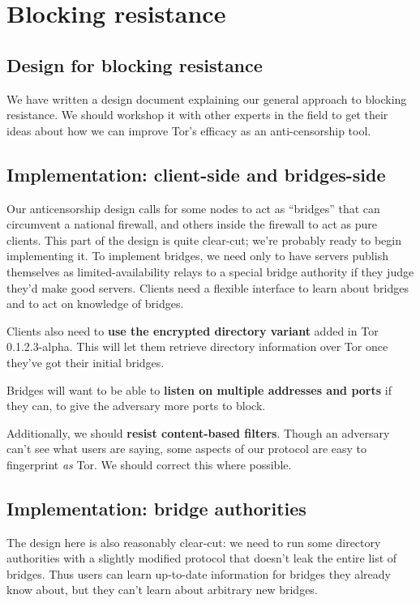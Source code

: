 \documentclass{article}
\begin{document}
\section{Blocking resistance}

\subsection{Design for blocking resistance}
We have written a design document explaining our general approach to blocking
resistance.  We should workshop it with other experts in the field to get
their ideas about how we can improve Tor's efficacy as an anti-censorship
tool.


\subsection{Implementation: client-side and bridges-side}
Our anticensorship design calls for some nodes to act as ``bridges'' that can
circumvent a national firewall, and others inside the firewall to act as pure
clients.  This part of the design is quite clear-cut; we're probably ready to begin
implementing it.  To implement bridges, we need only to have servers publish
themselves as limited-availability relays to a special bridge authority if
they judge they'd make good servers.  Clients need a flexible interface to
learn about bridges and to act on knowledge of bridges.

Clients also need to {\bf use the encrypted directory variant} added in Tor
0.1.2.3-alpha.  This will let them retrieve directory information over Tor
once they've got their initial bridges.

Bridges will want to be able to {\bf listen on multiple addresses and ports}
if they can, to give the adversary more ports to block.

Additionally, we should {\bf resist content-based filters}.  Though an
adversary can't see what users are saying, some aspects of our protocol are
easy to fingerprint {\em as} Tor.  We should correct this where possible.

\subsection{Implementation: bridge authorities}

The design here is also reasonably clear-cut: we need to run some
directory authorities with a slightly modified protocol that doesn't leak
the entire list of bridges. Thus users can learn up-to-date information
for bridges they already know about, but they can't learn about arbitrary
new bridges.
\end{document}
